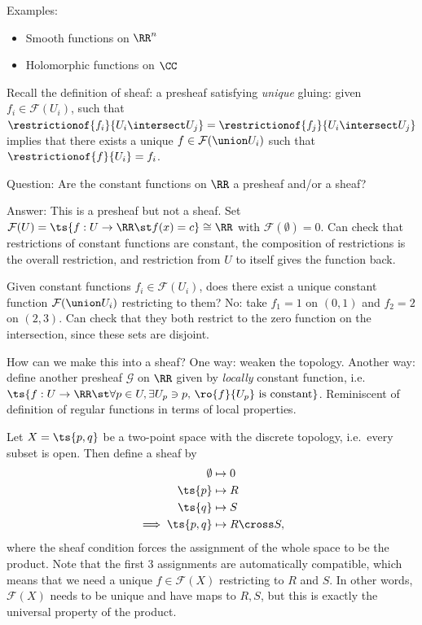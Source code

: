 Examples:

\begin{itemize}
\tightlist
\item
  Smooth functions on \(\RR^n\)
\item
  Holomorphic functions on \(\CC\)
\end{itemize}

Recall the definition of sheaf: a presheaf satisfying \emph{unique}
gluing: given \(f_i \in \mathcal{F}(U_i)\), such that
\(\restrictionof{f_i}{U_i \intersect U_j} = \restrictionof{f_j}{U_i\intersect U_j}\)
implies that there exists a unique \(f\in \mathcal{F}(\union U_i)\) such
that \(\restrictionof{f}{U_i} = f_i\).

Question: Are the constant functions on \(\RR\) a presheaf and/or a
sheaf?

Answer: This is a presheaf but not a sheaf. Set
\(\mathcal{F}(U) = \ts{f: U\to \RR \st f(x) = c} \cong \RR\) with
\(\mathcal{F}(\emptyset) = 0\). Can check that restrictions of constant
functions are constant, the composition of restrictions is the overall
restriction, and restriction from \(U\) to itself gives the function
back.

Given constant functions \(f_i \in \mathcal{F}(U_i)\), does there exist
a unique constant function \(\mathcal{F}(\union U_i)\) restricting to
them? No: take \(f_1 = 1\) on \((0, 1)\) and \(f_2 = 2\) on \((2, 3)\).
Can check that they both restrict to the zero function on the
intersection, since these sets are disjoint.

How can we make this into a sheaf? One way: weaken the topology. Another
way: define another presheaf \(\mathcal{G}\) on \(\RR\) given by
\emph{locally} constant function,
i.e.~\(\ts{f: U\to \RR \st \forall p\in U, \exists U_p\ni p,\, \ro{f}{U_p} \text{ is constant}}\).
Reminiscent of definition of regular functions in terms of local
properties.

\begin{example}

Let \(X = \ts{p, q}\) be a two-point space with the discrete topology,
i.e.~every subset is open. Then define a sheaf by
\begin{align*}  
\emptyset &\mapsto 0 \\
\ts{p} &\mapsto R \\
\ts{q} &\mapsto S \\
\implies \ts{p, q} &\mapsto R\cross S
,\end{align*} where the sheaf condition forces the assignment of the
whole space to be the product. Note that the first 3 assignments are
automatically compatible, which means that we need a unique
\(f\in \mathcal{F}(X)\) restricting to \(R\) and \(S\). In other words,
\(\mathcal{F}(X)\) needs to be unique and have maps to \(R, S\), but
this is exactly the universal property of the product.

\end{example}

